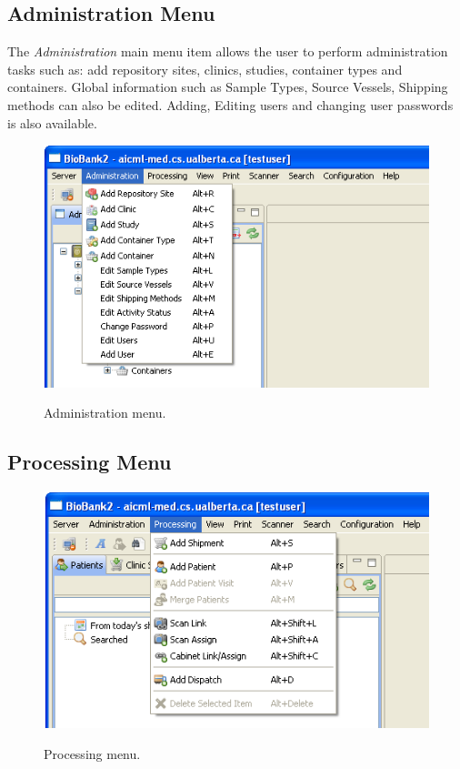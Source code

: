 \subsection{Administration Menu}
The \emph{Administration} main menu item allows the user to perform
administration tasks such as: add repository sites, clinics, studies, container
types and containers. Global information such as Sample Types, Source Vessels,
Shipping methods can also be edited. Adding, Editing users and changing user
passwords is also available.
    \begin{figure}[H]
      \centering
      \scalebox{0.5}
      { \includegraphics*{screenshots/overview/main_menu_administration} }
      \caption{Administration menu.}
      \label{fig:main_menu_administration}
    \end{figure}

\subsection{Processing Menu}
    \begin{figure}[H]
      \centering
      \scalebox{0.5}
      { \includegraphics*{screenshots/overview/main_menu_processing} }
      \caption{Processing menu.}
      \label{fig:main_menu_processing}
    \end{figure}

